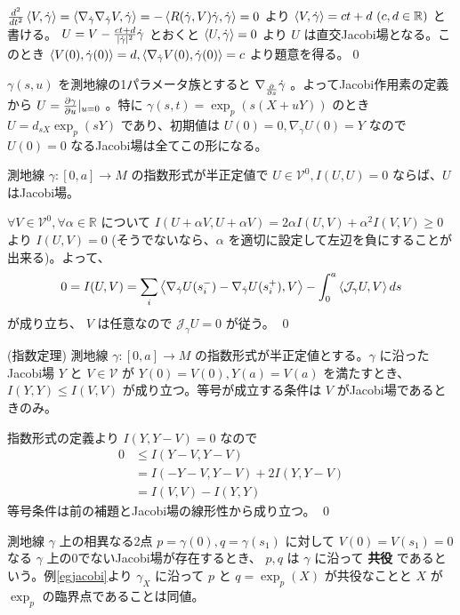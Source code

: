 \documentclass[dvipdfmx,a4paper]{jsreport}
\theoremstyle{definition}
\newcommand{\der}{\partial}
\newcommand{\R}{\mathbb{R}}
\begin{document}
\prf ${d^2 \over dt^2}\ev{V,\dot{\gamma}}=\ev{\nabla_{\dot{\gamma}}\nabla_{\dot{\gamma}}V,\dot{\gamma}}=-\ev{R(\dot{\gamma},V)\dot{\gamma},\dot{\gamma}}=0$ より $\ev{V,\dot{\gamma}}=ct+d\ (c,d \in \R)$ と書ける。 $U=V-{ct+d \over |\dot{\gamma}|^2}\dot{\gamma}$ とおくと $\ev{U,\dot{\gamma}}=0$ より $U$ は直交Jacobi場となる。このとき $\ev{V(0),\dot{\gamma}(0)}=d,\ev{\nabla_{\dot{\gamma}}V(0),\dot{\gamma}(0)}=c$ より題意を得る。\qed


\eg\label{egjacobi} $\gamma(s,u)$ を測地線の1パラメータ族とすると $\nabla_{\der \over \der s} \dot{\gamma}$ 。よってJacobi作用素の定義から $U={\der \gamma \over \der u}|_{u=0}$ 。特に $\gamma(s,t)=\exp_p (s(X+uY))$ のとき $U=d_{sX}\exp_{p}(sY)$ であり、初期値は $U(0)=0,\nabla_{\dot{\gamma}}U(0)=Y$ なので $U(0)=0$ なるJacobi場は全てこの形になる。

\lem\label{lemjacobi} 測地線 $\gamma:[0,a] \to M$ の指数形式が半正定値で $U \in \mathcal{V}^0,I(U,U)=0$ ならば、$U$ はJacobi場。

\prf $\forall V \in \mathcal{V}^0,\forall \alpha \in \mathbb{R}$ について $I(U+\alpha V,U+\alpha V)=2\alpha I(U,V)+\alpha^2I(V,V)\geq 0$ より $I(U,V) =0$ (そうでないなら、$\alpha$ を適切に設定して左辺を負にすることが出来る)。よって、
\begin{align*}
    0=I(U,V)=\sum_i \ev{\nabla_{\dot{\gamma}}U(s_i^-)-\nabla_{\dot{\gamma}}U(s_i^+),V}-\int_0^a \ev{\mathcal{J}_\gamma U,V} ds
\end{align*}
が成り立ち、 $V$ は任意なので $\mathcal{J}_\gamma U=0$ が従う。 \qed

\lem\label{lemindex} (指数定理) 測地線 $\gamma:[0,a] \to M$ の指数形式が半正定値とする。$\gamma$ に沿ったJacobi場 $Y$ と $V \in \mathcal{V}$ が $Y(0)=V(0),Y(a)=V(a)$ を満たすとき、$I(Y,Y) \leq I(V,V)$ が成り立つ。等号が成立する条件は $V$ がJacobi場であるときのみ。

\prf 指数形式の定義より $I(Y,Y-V)=0$ なので
\begin{align*}
    0 &\leq I(Y-V,Y-V) \\
    &=I(-Y-V,Y-V)+2I(Y,Y-V) \\
    &=I(V,V)-I(Y,Y)
\end{align*}
等号条件は前の補題とJacobi場の線形性から成り立つ。 \qed

 測地線 $\gamma$ 上の相異なる2点 $p=\gamma(0),q=\gamma(s_1)$ に対して $V(0)=V(s_1)=0$ なる $\gamma$ 上の0でないJacobi場が存在するとき、 $p,q$ は $\gamma$ に沿って \textbf{共役} であるという。例\ref{egjacobi}より $\gamma_X$ に沿って $p$ と $q=\exp_p(X)$ が共役なことと $X$ が $\exp_p$ の臨界点であることは同値。
\end{document}
